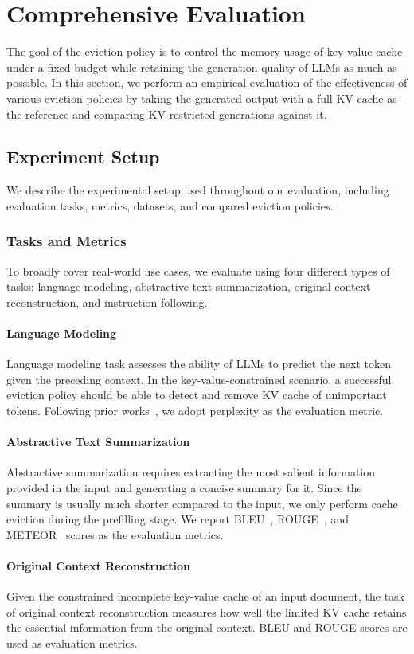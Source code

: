 \section{Comprehensive Evaluation}
The goal of the eviction policy is to control the memory usage of key-value cache under a fixed budget while retaining the generation quality of LLMs as much as possible. 
In this section, we perform an empirical evaluation of the effectiveness of various eviction policies by taking the generated output with a full KV cache as the reference and comparing KV-restricted generations against it.
\subsection{Experiment Setup}
We describe the experimental setup used throughout our evaluation, including evaluation tasks, metrics, datasets, and compared eviction policies.
\subsubsection{Tasks and Metrics}
\label{sec:tasks}
To broadly cover real-world use cases, we evaluate using four different types of tasks: language modeling, abstractive text summarization, original context reconstruction, and instruction following.
\paragraph{Language Modeling} Language modeling task assesses the ability of LLMs to predict the next token given the preceding context. In the key-value-constrained scenario, a successful eviction policy should be able to detect and remove KV cache of unimportant tokens. Following prior works~\cite{llminfinite,xiao2023efficient,tova}, we adopt perplexity as the evaluation metric.
\paragraph{Abstractive Text Summarization} Abstractive summarization requires extracting the most salient information provided in the input and generating a concise summary for it. Since the summary is usually much shorter compared to the input, we only perform cache eviction during the prefilling stage. We report BLEU~\cite{bleu}, ROUGE~\cite{rouge}, and METEOR~\cite{meteor} scores as the evaluation metrics.
\paragraph{Original Context Reconstruction} Given the constrained incomplete key-value cache of an input document, the task of original context reconstruction measures how well the limited KV cache retains the essential information from the original context. BLEU and ROUGE scores are used as evaluation metrics.
